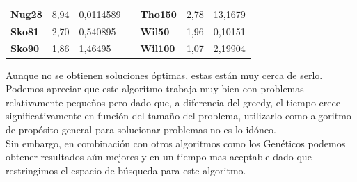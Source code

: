 \documentclass[a4paper, 12pt]{article}
\begin{document}
\begin{table}[H]
\begin{tabular}{|l|l|l|l|l|l|l|}
\textbf{Nug28}   & 8,94                               & 0,0114589                            &  & \textbf{Tho150}  & 2,78                               & 13,1679                              \\ \cline{1-3} \cline{5-7} 
\textbf{Sko81}   & 2,70                               & 0,540895                             &  & \textbf{Wil50}   & 1,96                               & 0,10151                              \\ \cline{1-3} \cline{5-7} 
\textbf{Sko90}   & 1,86                               & 1,46495                              &  & \textbf{Wil100}  & 1,07                               & 2,19904                              \\ \cline{1-3} \cline{5-7} 
\end{tabular}
\end{table}

      Aunque no se obtienen soluciones óptimas, estas están muy cerca de serlo. Podemos apreciar que este algoritmo trabaja muy bien con problemas relativamente pequeños pero dado que, a diferencia del greedy, el tiempo crece significativamente en función del tamaño del problema, utilizarlo como algoritmo de propósito general para solucionar problemas no es lo idóneo.\\
      
      Sin embargo, en combinación con otros algoritmos como los Genéticos podemos obtener resultados aún mejores y en un tiempo mas aceptable dado que restringimos el espacio de búsqueda para este algoritmo.


      
      \newpage
\end{document}
